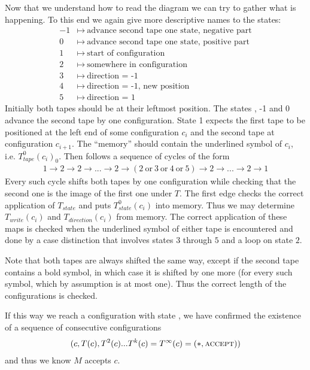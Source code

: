 	Now that we understand how to read the diagram we can try to gather what is happening. To this end we again give more descriptive names to the states:
	\begin{align*}
		-1 &\mapsto~\text{advance second tape one state, negative part} \\
		0 &\mapsto~\text{advance second tape one state, positive part} \\
		1 &\mapsto~\text{start of configuration} \\
		2 &\mapsto~\text{somewhere in configuration} \\
		3 &\mapsto~\text{direction = -1} \\
		4 &\mapsto~\text{direction = -1, new position} \\
		5 &\mapsto~\text{direction = 1}
	\end{align*}
	Initially both tapes should be at their leftmost position.
	The states \INI, -1 and 0 advance the second tape by one configuration.
	State 1 expects the first tape to be positioned at the left end of some configuration $c_i$ and the second tape at configuration $c_{i+1}$.
	The ``memory'' should contain the underlined symbol of $c_i$, i.e. $T_{tape}^0(c_i)_0$.
	Then follows a sequence of cycles of the form
	\begin{align*}
		1 \to 2 \to 2 \to ... \to 2 \to (2~\text{or}~3~\text{or}~4~\text{or}~5) \to 2 \to ... \to 2 \to 1
	\end{align*}
	Every such cycle shifts both tapes by one configuration while checking that the second one is the image of the first one under $T$.
	The first edge  checks the correct application of $T_{state}$ and puts $T_{state}^0(c_i)$ into memory.
	Thus we may determine $T_{write}(c_i)$ and $T_{direction}(c_i)$ from memory.
	The correct application of these maps is checked when the underlined symbol of either tape is encountered and done by a case distinction that involves states $3$ through $5$ and a loop on state $2$.

	Note that both tapes are always shifted the same way, except if the second tape contains a bold symbol, in which case it is shifted by one more (for every such symbol, which by assumption is at most one).
	Thus the correct length of the configurations is checked.

	If this way we reach a configuration with state \ACC, we have confirmed the existence of a sequence of consecutive configurations
	\begin{align*}
		(c, T(c), T^2(c) ... T^k(c) = T^\infty(c) = (*,\text{\scshape{accept}}))
	\end{align*}
	and thus we know $M$ accepts $c$.

